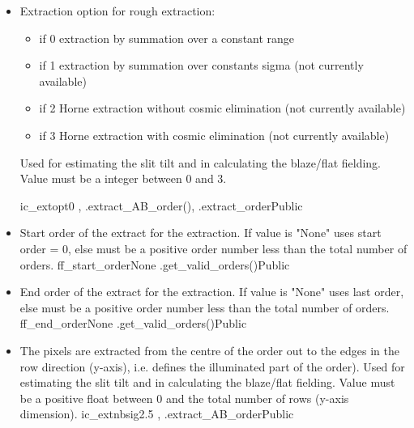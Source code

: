 \begin{itemize}

\item {}
{Extraction option for rough extraction:
\begin{itemize}
\item if 0 extraction by summation over a constant range
\item if 1 extraction by summation over constants sigma (not currently available)
\item if 2 Horne extraction without cosmic elimination (not currently available)
\item if 3 Horne extraction with cosmic elimination (not currently available)
\end{itemize}
 Used for estimating the slit tilt and in calculating the blaze/flat fielding. Value must be a integer between 0 and 3.
}
{ic\_extopt}{0}
{\calSLIT, \calFFraw}{\constantsfile}
{\spirouEXTOR.extract\_AB\_order(), \spirouEXTOR.extract\_order}{Public}


\item {}
{Start order of the extract for the extraction. If value is "None" uses start order = 0, else must be a positive order number less than the total number of orders.}
{ff\_start\_order}{None}
{\calextractRAW}{\constantsfile}{\spirouEXTOR.get\_valid\_orders()}{Public}


\item {}
{End order of the extract for the extraction. If value is "None" uses last order, else must be a positive order number less than the total number of orders.}
{ff\_end\_order}{None}
{\calextractRAW}{\constantsfile}{\spirouEXTOR.get\_valid\_orders()}{Public}


\item {}
{The pixels are extracted from the centre of the order out to the edges in the row direction (y-axis), i.e. defines the illuminated part of the order). Used for estimating the slit tilt and in calculating the blaze/flat fielding. Value must be a positive float between 0 and the total number of rows (y-axis dimension).}
{ic\_extnbsig}{2.5}
{\calSLIT, \calFFraw}{\constantsfile}{\spirouEXTOR.extract\_AB\_order}{Public}



\end{itemize}
